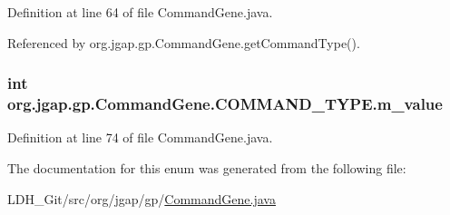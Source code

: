 Definition at line 64 of file Command\-Gene.\-java.



Referenced by org.\-jgap.\-gp.\-Command\-Gene.\-get\-Command\-Type().

\hypertarget{enumorg_1_1jgap_1_1gp_1_1_command_gene_1_1_c_o_m_m_a_n_d___t_y_p_e_ab3894d76aba663f75f77e72c51e347d8}{
\subsubsection[{m\-\_\-value}]{\setlength{\rightskip}{0pt plus 5cm}int org.\-jgap.\-gp.\-Command\-Gene.\-C\-O\-M\-M\-A\-N\-D\-\_\-\-T\-Y\-P\-E.\-m\-\_\-value\hspace{0.3cm}{\ttfamily [private]}}}\label{enumorg_1_1jgap_1_1gp_1_1_command_gene_1_1_c_o_m_m_a_n_d___t_y_p_e_ab3894d76aba663f75f77e72c51e347d8}


Definition at line 74 of file Command\-Gene.\-java.



The documentation for this enum was generated from the following file\-:\begin{DoxyCompactItemize}
\item 
L\-D\-H\-\_\-\-Git/src/org/jgap/gp/\hyperlink{_command_gene_8java}{Command\-Gene.\-java}\end{DoxyCompactItemize}
